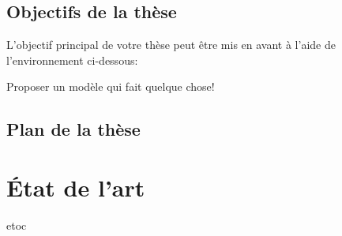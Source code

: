 \documentclass[french]{spimumlpphdthesis}
\begin{document}
\section{Objectifs de la thèse}

L'objectif principal de votre thèse peut être mis en avant à l'aide de l'environnement ci-dessous:

\begin{emphbox}
	Proposer un modèle qui fait quelque chose!
\end{emphbox}

\section{Plan de la thèse}

\chapter{\'Etat de l'art}

%
%
%
%
etoc
%
%
\end{document}
